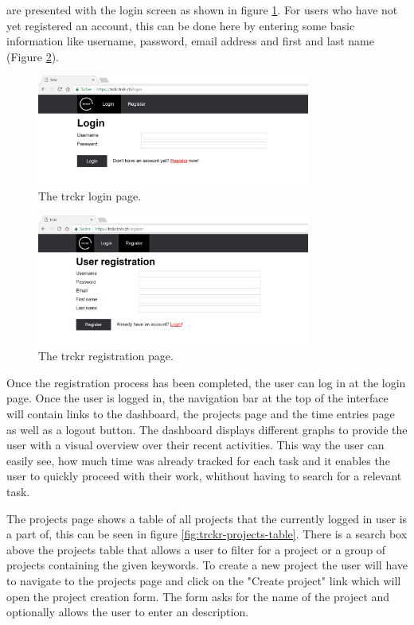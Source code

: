 \documentclass[bibliography=totoc, listof=totocnumbered]{scrartcl}
\begin{document}
 are presented with the login
screen as shown in figure \ref{fig:trckr-login}. For users who have not yet
registered an account, this can be done here by entering some basic information
like username, password, email address and first and last name (Figure
\ref{fig:trckr-register}).

\begin{figure}[h]
    \includegraphics[width=0.8\textwidth]{trckr-login}
    \caption{The trckr login page.}
    \label{fig:trckr-login}
\end{figure}

\begin{figure}[h]
    \includegraphics[width=0.8\textwidth]{trckr-register}
    \caption{The trckr registration page.}
    \label{fig:trckr-register}
\end{figure}

Once the registration process has been completed, the
user can log in at the login page. Once the user is logged in, the navigation
bar at the top of the interface will contain links to the dashboard, the
projects page and the time entries page as well as a logout button. The dashboard
displays different graphs to provide the user with a visual overview over their recent activities.
This way the user can easily see, how much time was already tracked for each task and it enables
the user to quickly proceed with their work, whithout having to search for a relevant task.

The projects page shows a table of all projects that the currently logged in
user is a part of, this can be seen in figure \ref{fig:trckr-projects-table}. There is a
search box above the projects table that allows a user to filter for a project or
a group of projects containing the given keywords. To create a new project the
user will have to navigate to the projects page and click on the "Create
project" link which will open the project creation form. %
The form asks for the name of the project and optionally allows the user to enter an
description.
\end{document}
